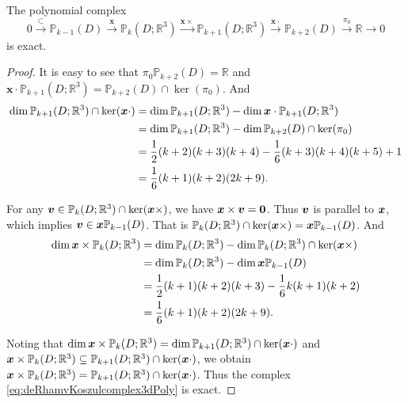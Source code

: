 \begin{lemma}\label{lem:Koszul}
The polynomial complex
\begin{equation}\label{eq:deRhamvKoszulcomplex3dPoly}
0\xrightarrow{\subset}\mathbb P_{k-1}(D) \xrightarrow{\boldsymbol x} \mathbb P_k(D; \mathbb R^3) \xrightarrow{\boldsymbol x\times} \mathbb P_{k+1}(D; \mathbb R^3)\xrightarrow{\boldsymbol x\cdot} \mathbb P_{k+2}(D)\xrightarrow{\pi_{0}}\mathbb {R}\xrightarrow{}0
\end{equation}
is exact.
\end{lemma}
\begin{proof}
It is easy to see that $\pi_0\mathbb P_{k+2}(D)=\mathbb R$ and $\boldsymbol x\cdot\mathbb P_{k+1}(D; \mathbb R^3)=\mathbb P_{k+2}(D)\cap\ker(\pi_0)$. And
\begin{align*}
\dim\mathbb P_{k+1}(D; \mathbb R^3)\cap\ker(\boldsymbol x\cdot)&=\dim\mathbb P_{k+1}(D; \mathbb R^3)-\dim\boldsymbol x\cdot\mathbb P_{k+1}(D; \mathbb R^3) \\
&=\dim\mathbb P_{k+1}(D; \mathbb R^3)-\dim\mathbb P_{k+2}(D)\cap\ker(\pi_0) \\
&=\frac{1}{2}(k+2)(k+3)(k+4) - \frac{1}{6}(k+3)(k+4)(k+5) + 1 \\
&=\frac{1}{6}(k+1)(k+2)(2k+9).
\end{align*}

For any $\boldsymbol v\in\mathbb P_{k}(D; \mathbb R^3)\cap\ker(\boldsymbol x\times)$, we have $\boldsymbol x\times\boldsymbol v=\boldsymbol0$. Thus $\boldsymbol v$ is parallel to $\boldsymbol x$, which implies $\boldsymbol v\in\boldsymbol x\mathbb P_{k-1}(D)$. That is $\mathbb P_{k}(D; \mathbb R^3)\cap\ker(\boldsymbol x\times)=\boldsymbol x\mathbb P_{k-1}(D)$. And
\begin{align*}
\dim\boldsymbol x\times\mathbb P_{k}(D; \mathbb R^3)&=\dim\mathbb P_{k}(D; \mathbb R^3)-\dim\mathbb P_{k}(D; \mathbb R^3)\cap\ker(\boldsymbol x\times) \\
&=\dim\mathbb P_{k}(D; \mathbb R^3)-\dim\boldsymbol x\mathbb P_{k-1}(D) \\
&=\frac{1}{2}(k+1)(k+2)(k+3) - \frac{1}{6}k(k+1)(k+2) \\
&=\frac{1}{6}(k+1)(k+2)(2k+9).
\end{align*}

Noting that $\dim\boldsymbol x\times\mathbb P_{k}(D; \mathbb R^3)=\dim\mathbb P_{k+1}(D; \mathbb R^3)\cap\ker(\boldsymbol x\cdot)$ and $\boldsymbol x\times\mathbb P_{k}(D; \mathbb R^3)\subseteq\mathbb P_{k+1}(D; \mathbb R^3)\cap\ker(\boldsymbol x\cdot)$, we obtain $\boldsymbol x\times\mathbb P_{k}(D; \mathbb R^3)=\mathbb P_{k+1}(D; \mathbb R^3)\cap\ker(\boldsymbol x\cdot)$.
Thus the complex \eqref{eq:deRhamvKoszulcomplex3dPoly} is exact.
\end{proof}

